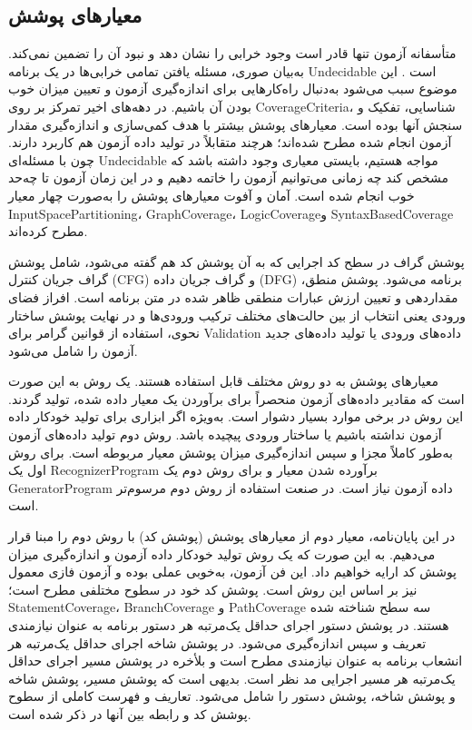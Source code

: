  \subsection{معیارهای پوشش}
  متأسفانه آزمون تنها قادر است وجود خرابی را نشان دهد و نبود آن را تضمین نمی‌کند. به‌بیان صوری، مسئله یافتن تمامی خرابی‌ها در یک برنامه \gls{Undecidable} است \cite{ammann2016introduction}. این موضوع سبب می‌شود به‌دنبال راه‌کارهایی برای اندازه‌گیری آزمون و تعیین میزان خوب بودن آن باشیم. در دهه‌های اخیر تمرکز بر روی \gls{CoverageCriteria}، شناسایی، تفکیک و سنجش آنها بوده است. معیارهای پوشش بیشتر با هدف کمی‌سازی و اندازه‌گیری مقدار آزمون انجام شده مطرح شده‌اند؛ هرچند متقابلاً در تولید داده آزمون هم کاربرد دارند. چون با مسئله‌ای \gls{Undecidable} مواجه هستیم، بایستی معیاری وجود داشته باشد که مشخص کند چه زمانی می‌توانیم آزمون را خاتمه دهیم و در این زمان آزمون تا چه‌حد خوب انجام شده است. آمان  
  	 و آفوت \cite{ammann2016introduction}
  	   معیارهای پوشش را به‌صورت چهار معیار \gls{InputSpacePartitioning}،  \gls{GraphCoverage}، \gls{LogicCoverage}و \gls{SyntaxBasedCoverage} مطرح کرده‌اند.
  
  
  پوشش گراف در سطح کد اجرایی که به آن پوشش کد هم گفته می‌شود، شامل پوشش گراف جریان کنترل (\gls{CFG}) و گراف جریان داده (\gls{DFG}) برنامه می‌شود. پوشش  منطق، مقدار‌دهی و تعیین ارزش عبارات منطقی ظاهر شده در متن برنامه است. افراز فضای ورودی یعنی انتخاب از بین حالت‌های مختلف ترکیب ورودی‌ها و در نهایت پوشش ساختار نحوی، استفاده از قوانین گرامر برای \gls{Validation} داده‌های ورودی یا تولید داده‌های جدید آزمون را شامل می‌شود.
  
  
  معیارهای پوشش به دو روش مختلف قابل استفاده هستند. یک روش به این صورت است که مقادیر داده‌های آزمون منحصراً برای برآوردن یک معیار داده شده، تولید گردند. این روش در برخی موارد بسیار دشوار است. به‌ویژه اگر ابزاری برای تولید خودکار داده آزمون نداشته باشیم یا ساختار ورودی پیچیده باشد. روش دوم تولید داده‌های آزمون به‌طور کاملاً مجزا و سپس اندازه‌گیری میزان پوشش معیار مربوطه است. برای روش اول یک \gls{RecognizerProgram} برآورده شدن معیار و برای روش دوم یک \gls{GeneratorProgram} داده آزمون نیاز است. در صنعت استفاده از روش دوم مرسوم‌تر است\cite{ammann2016introduction}.
  
  
  در این پایان‌نامه، معیار دوم از معیارهای پوشش (پوشش کد) با روش دوم را مبنا قرار می‌دهیم. به این صورت که یک روش تولید خودکار داده آزمون و اندازه‌گیری میزان پوشش کد ارایه خواهیم داد. این فن آزمون، به‌خوبی عملی بوده و آزمون فازی معمول نیز بر اساس این روش است. پوشش کد خود در سطوح مختلفی مطرح است؛ \gls{StatementCoverage}، \gls{BranchCoverage} و \gls{PathCoverage} سه سطح شناخته شده هستند. در پوشش دستور اجرای حداقل یک‌مرتبه هر دستور برنامه به عنوان نیازمندی تعریف و سپس اندازه‌گیری می‌شود. در پوشش شاخه اجرای حداقل یک‌مرتبه هر انشعاب برنامه به عنوان نیازمندی مطرح است و بلأخره در پوشش مسیر اجرای حداقل یک‌مرتبه هر مسیر اجرایی مد نظر است. بدیهی است که  پوشش مسیر، پوشش شاخه و پوشش شاخه، پوشش دستور را شامل می‌شود. تعاریف و فهرست کاملی از سطوح پوشش کد و رابطه بین آنها در \cite{ammann2016introduction} ذکر شده است. 
  
